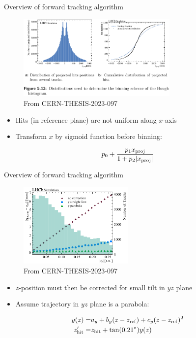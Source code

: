 \documentclass[xcolor={dvipsnames}]{beamer}
\begin{document}
\begin{frame}{Overview of forward tracking algorithm}
  \vspace{0.0cm}
  \begin{figure}[htb]
    \centering
    \includegraphics[width=0.7\textwidth]{Plots/HoughDistribution.png}
  \caption*{\small From CERN-THESIS-2023-097}
  \end{figure}
  \vspace{-0.3cm}
  \begin{itemize}
    \item{Hits (in reference plane) are not uniform along $x$-axis}
    \item{Transform $x$ by sigmoid function before binning:}
  \end{itemize}
  \begin{equation*}
    p_0 + \frac{p_1x_{\rm proj}}{1 + p_2\lvert x_{\rm proj}\rvert}
  \end{equation*}
\end{frame}

\begin{frame}{Overview of forward tracking algorithm}
  \vspace{0.0cm}
  \begin{figure}[htb]
    \centering
    \includegraphics[width=0.5\textwidth]{Plots/yCorrectionPerformance.png}
  \caption*{\small From CERN-THESIS-2023-097}
  \end{figure}
  \vspace{-0.3cm}
  \begin{itemize}
    \item{$z$-position must then be corrected for small tilt in $yz$ plane}
    \item{Assume trajectory in $yz$ plane is a parabola:}
  \end{itemize}
  \begin{align*}
    y(z) =& a_y + b_y(z - z_{\rm ref}) + c_y(z - z_{\rm ref})^2 \\
    z_{\rm hit}^\prime =& z_{\rm hit} + \tan(0.21^\circ)y(z)
  \end{align*}
\end{frame}
\end{document}
